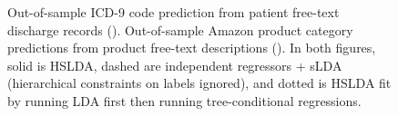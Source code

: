 \begin{figure}%
\begin{center}
\caption{Out-of-sample ICD-9 code prediction from patient free-text discharge records 
(). Out-of-sample Amazon product category predictions from 
product free-text descriptions (). In both figures, solid is 
HSLDA, dashed are independent regressors + sLDA (hierarchical 
constraints on labels ignored), and dotted is HSLDA fit by running LDA first then running 
tree-conditional regressions.}
\label{fig:main_results}
\end{center}
\end{figure}

